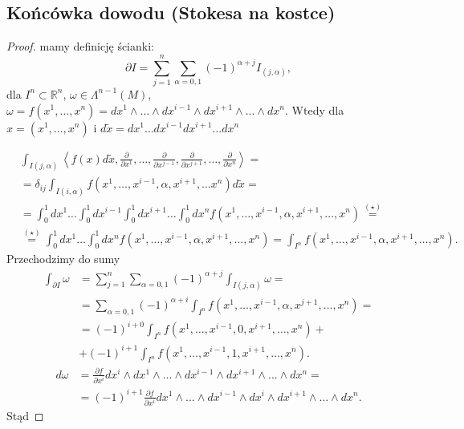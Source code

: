\documentclass[../main.tex]{subfiles}
\begin{document}
\subsection{Końcówka dowodu (Stokesa na kostce)}
\begin{proof}

mamy definicję ścianki:
\[
    \partial I = \sum_{j = 1}^n\sum_{\alpha = 0,1}(-1)^{\alpha+j}I_{(j,\alpha)}
,\]
dla $I^n\subset\mathbb{R}^n$, $\omega\in \Lambda^{n-1}(M)$, $\omega = f(x^1, \ldots, x^n) = dx^1\land \ldots\land dx^{i-1}\land dx^{i+1}\land \ldots\land dx^n$. Wtedy dla $x = (x^1,\ldots,x^n)$ i $d\tilde x = dx^1\ldots dx^{i-1}dx^{i+1}\ldots dx^n$

\begin{align*}
    &\int_{I(j,\alpha)}\left<f(x) d\tilde x, \frac{\partial }{\partial x^1}, \ldots, \frac{\partial }{\partial x^{j-1}}, \frac{\partial }{\partial x^{j+1}}, \ldots, \frac{\partial }{\partial x^n} \right> = \\
    &= \delta_{ij} \int_{I(i,\alpha)}f(x^1,\ldots,x^{i-1},\alpha, x^{i+1}, \ldots x^n)d\tilde x =\\
    &= \int_0^1 dx^1 \ldots \int_0^1 dx^{i-1} \int_0^1 dx^{i+1} \ldots \int_0^1 dx^n f(x^1,\ldots,x^{i-1},\alpha, x^{i+1}, \ldots, x^n) \overset{(\star)}{=}\\
        &\overset{(\star)}{=} \int_0^1dx^1\ldots\int_0^1dx^n f(x^1,\ldots, x^{i-1},\alpha, x^{i+1}, \ldots, x^n) = \int_{I^n}f(x^1,\ldots,x^{i-1},\alpha, x^{i+1}, \ldots, x^n)
.\end{align*}
Przechodzimy do sumy
\begin{align*}
    \int_{\partial I}\omega &= \sum_{j=1}^{n} \sum_{\alpha = 0,1} (-1)^{\alpha+j}\int_{I(j,\alpha)}\omega =\\
    &= \sum_{\alpha = 0,1}(-1)^{\alpha + i}\int_{I^n}f(x^1,\ldots,x^{i-1},\alpha,x^{j+1},\ldots,x^n) =\\
    &= (-1)^{i+0}\int_{I^n}f(x^1,\ldots,x^{i-1}, 0, x^{i+1},\ldots,x^n) + \\
    &+ (-1)^{i+1}\int_{I^n}f(x^1,\ldots,x^{i-1},1,x^{i+1},\ldots,x^n)
.\end{align*}
\begin{align*}
    d\omega &= \frac{\partial f}{\partial x^i} dx^i\land dx^1\land \ldots\land dx^{i-1}\land dx^{i+1}\land \ldots\land dx^n = \\
    &= (-1)^{i+1} \frac{\partial f}{\partial x^i} dx^1\land \ldots\land dx^{i-1}\land dx^i \land dx^{i+1} \land \ldots \land dx^n
.\end{align*}
Stąd

\end{proof}
\end{document}
